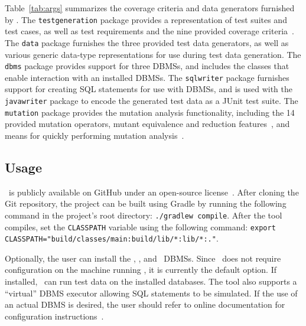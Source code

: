 Table~\ref{tab:args} summarizes the coverage criteria and data generators furnished by \sa. The \texttt{testgeneration}
package provides a representation of test suites and test cases, as well as test requirements and the nine provided
coverage criteria~\cite{mcminn2015effectiveness}.  The \texttt{data} package furnishes the three provided test data
generators, as well as various generic data-type representations for use during test data generation. The \texttt{dbms}
package provides support for three DBMSs, and includes the classes that enable interaction with an installed DBMSs. The
\texttt{sqlwriter} package furnishes support for creating SQL statements for use with DBMSs, and is used with the
\texttt{javawriter} package to encode the generated test data as a JUnit test suite.  The \texttt{mutation} package
provides the mutation analysis functionality, including the 14 provided mutation operators, mutant equivalence and
reduction features~\cite{wright2014impact}, and means for quickly performing mutation analysis~\cite{mcminn2016virtual}.

\subsection{Usage}



\sa~is publicly available on GitHub under an open-source license~\cite{tool}. After cloning the Git
repository, the project can be built using Gradle by running the following command in the project's root directory:
\lstinline{./gradlew compile}. After the tool compiles, set the \lstinline{CLASSPATH} variable using the following
command: \lstinline{export CLASSPATH="build/classes/main:build/lib/*:lib/*:."}.


Optionally, the user can install the \postgres, \sqlite, and \hypersql~DBMSs. Since \sqlite~does not require
configuration on the machine running \sa, it is currently the default option. If installed, \sa~can run test data on
the installed databases. The tool also supports a ``virtual'' DBMS executor allowing SQL statements to be simulated. If the use
of an actual DBMS is desired, the user should refer to online documentation for configuration instructions~\cite{tool}.

